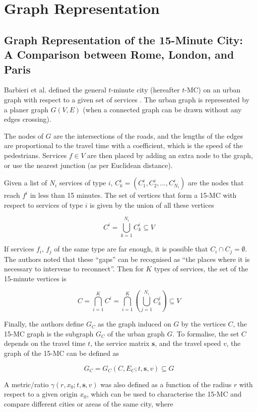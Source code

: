 \section{Graph Representation}

\subsection{Graph Representation of the 15-Minute City: A Comparison between Rome, London, and Paris} \label{barbieri_graph_2023}

Barbieri et al. defined the general $t$-minute city (hereafter $t$-MC) on an urban graph with respect to a given set of services \cite{barbieri_graph_2023}. The urban graph is represented by a planer graph $G(V,E)$ (when a connected graph can be drawn without any edges crossing).

The nodes of $G$ are the intersections of the roads, and the lengths of the edges are proportional to the travel time with a coefficient, which is the speed of the pedestrians. Services $f\in V$ are then placed by adding an extra node to the graph, or use the nearest junction (as per Euclidean distance).

Given a list of $N_i$ services of type $i$, $C^i_k=(C^i_1,C^i_2,...,C^i_{N_i})$ are the nodes that reach $f^i$ in less than 15 minutes. The set of vertices that form a 15-MC with respect to services of type $i$ is given by the union of all these vertices

$$ C^i=\bigcup_{k=1}^{N_i}C^i_k\subseteq V $$

If services $f_i$, $f_j$ of the same type are far enough, it is possible that $C_i\cap C_j=\emptyset$. The authors noted that these “gaps” can be recognised as “the places where it is necessary to intervene to reconnect”. Then for $K$ types of services, the set of the 15-minute vertices is

$$C=\bigcap^K_{i=1}C^i=\bigcap^K_{i=1}\left(\bigcup^{N_i}_{j=1}C^j_k\right)\subseteq V$$

Finally, the authors define $G_C$ as the graph induced on $G$ by the vertices $C$, the 15-MC graph is the subgraph $G_C$ of the urban graph $G$. To formalise, the set $C$ depends on the travel time $t$, the service matrix $\mathbf s$, and the travel speed $v$, the graph of the 15-MC can be defined as

$$ G_C=G_C(C,E_C;t,\mathbf s,v)\subseteq G $$

A metric/ratio $\gamma(r,x_0;t,\mathbf s,v)$ was also defined as a function of the radius $r$ with respect to a given origin $x_0$, which can be used to characterise the 15-MC and compare different cities or areas of the same city, where

